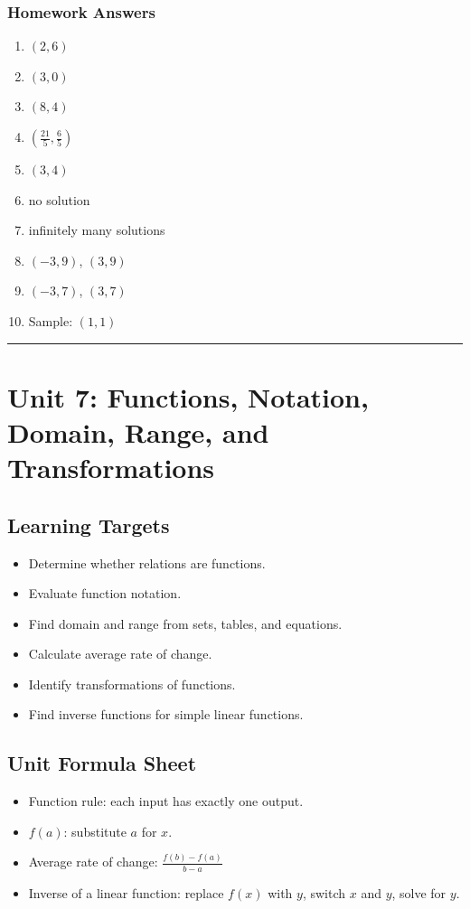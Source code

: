 \documentclass[11pt]{book}
\begin{document}
\subsection{Homework Answers}

\begin{enumerate}
\item \((2,6)\)
\item \((3,0)\)
\item \((8,4)\)
\item \((\frac{21}{5},\frac65)\)
\item \((3,4)\)
\item no solution
\item infinitely many solutions
\item \((-3,9)\), \((3,9)\)
\item \((-3,7)\), \((3,7)\)
\item Sample: \((1,1)\)
\end{enumerate}

\bigskip\hrule\bigskip

\chapter{Unit 7: Functions, Notation, Domain, Range, and Transformations}

\section{Learning Targets}

\begin{itemize}
\item Determine whether relations are functions.
\item Evaluate function notation.
\item Find domain and range from sets, tables, and equations.
\item Calculate average rate of change.
\item Identify transformations of functions.
\item Find inverse functions for simple linear functions.
\end{itemize}

\section{Unit Formula Sheet}

\begin{itemize}
\item Function rule: each input has exactly one output.
\item \(f(a)\): substitute \(a\) for \(x\).
\item Average rate of change: \(\frac{f(b)-f(a)}{b-a}\)
\item Inverse of a linear function: replace \(f(x)\) with \(y\), switch \(x\) and \(y\), solve for \(y\).
\end{itemize}
\end{document}
